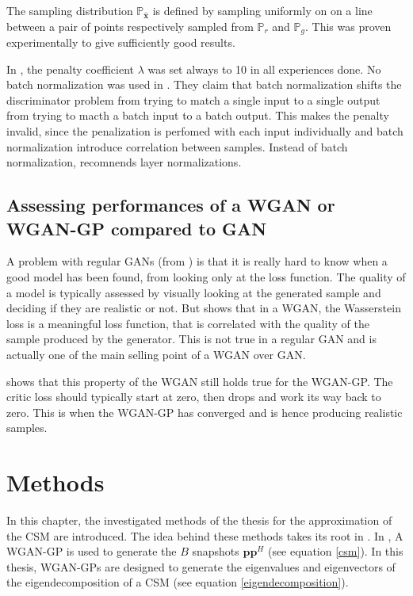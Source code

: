 \documentclass[11pt,a4paper,twoside]{report}
\begin{document}
The sampling distribution $\mathbb{P}_{\hat{\mathbf{x}}}$ is defined by sampling uniformly on on a line between a pair of points respectively sampled from $\mathbb{P}_{r}$ and $\mathbb{P}_{g}$. This was proven experimentally to give sufficiently good results.

In \cite{DBLP:journals/corr/GulrajaniAADC17}, the penalty coefficient $\lambda$ was set always to 10 in all experiences done. No batch normalization was used in \cite{DBLP:journals/corr/GulrajaniAADC17}. They claim that batch normalization shifts the discriminator problem from trying to match a single input to a single output from trying to macth a batch input to a batch output. This makes the penalty invalid, since the penalization is perfomed with each input individually and batch normalization introduce correlation between samples. Instead of batch normalization, \cite{DBLP:journals/corr/GulrajaniAADC17} recomnends layer normalizations.

\section{Assessing performances of a WGAN or WGAN-GP compared to GAN} \label{sec:assessing_perf}

A problem with regular GANs (from \cite{goodfellow2020generative}) is that it is really hard to know when a good model has been found, from looking only at the loss function. The quality of a model is typically assessed by visually looking at the generated sample and deciding if they are realistic or not. But \cite{arjovsky2017wasserstein} shows that in a WGAN, the Wasserstein loss is a meaningful loss function, that is correlated with the quality of the sample produced by the generator. This is not true in a regular GAN and is actually one of the main selling point of a WGAN over GAN.

\cite{DBLP:journals/corr/GulrajaniAADC17} shows that this property of the WGAN still holds true for the WGAN-GP. The critic loss should typically start at zero, then drops and work its way back to zero. This is when the WGAN-GP has converged and is hence producing realistic samples.

\chapter{Methods}

In this chapter, the investigated methods of the thesis for the approximation of the CSM are introduced. The idea behind these methods takes its root in \cite{gerstoft2020parametric}. In \cite{gerstoft2020parametric}, A WGAN-GP is used to generate the $B$ snapshots $\mathbf{p} \mathbf{p}^H$ (see equation \ref{csm}). In this thesis, WGAN-GPs are designed to generate the eigenvalues and eigenvectors of the eigendecomposition of a CSM (see equation \ref{eigendecomposition}).
\end{document}
